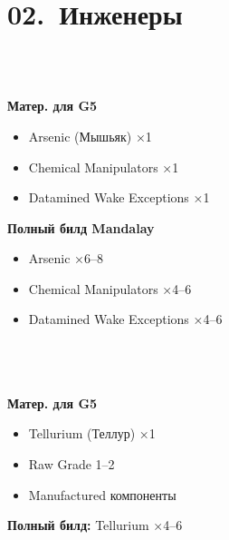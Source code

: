 \hypertarget{ch02}{}
\section{02.~Инженеры}


\begin{tcolorbox}[edbox-titled, title=1.~FELICITY FARSEER]
\\
\\
\edrule
{\color{edorange}\fontsize{6.5}{8}\selectfont\bfseries Матер. для G5\par}
\vspace{0.5mm}
\begin{itemize}
\item Arsenic (Мышьяк) ×1
\item Chemical Manipulators ×1
\item Datamined Wake Exceptions ×1
\end{itemize}
{\color{edorange}\fontsize{6.5}{8}\selectfont\bfseries Полный билд Mandalay}\\[0.5mm]
\begin{itemize}
\item Arsenic ×6--8
\item Chemical Manipulators ×4--6
\item Datamined Wake Exceptions ×4--6
\end{itemize}
\end{tcolorbox}

\begin{tcolorbox}[edbox-titled, title=2.~ELVIRA MARTUUK]
\\
\\
\\[1mm]
\edrule
{\color{edorange}\fontsize{6.5}{8}\selectfont\bfseries Матер. для G5}\\[0.5mm]
\begin{itemize}
\item Tellurium (Теллур) ×1
\item Raw Grade 1--2
\item Manufactured компоненты
\end{itemize}
{\color{edorange}\fontsize{6.5}{8}\selectfont\bfseries Полный билд:}
{\fontsize{7}{8.5}\selectfont Tellurium ×4--6}
\end{tcolorbox}

